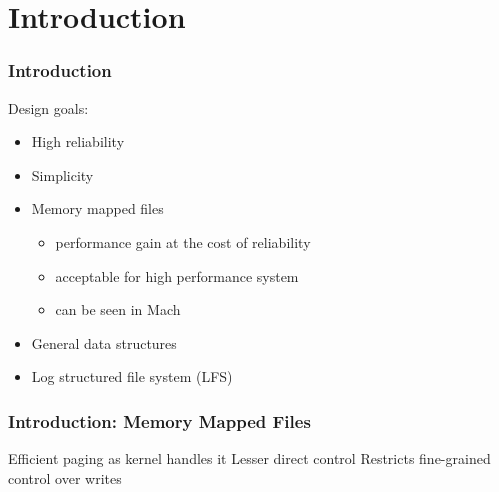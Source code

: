 \section{Introduction}

\begin{frame}
\frametitle{Introduction}
	Design goals:\\[0.5em]
	\begin{itemize}[<+->]
	\setlength\itemsep{1em}
	\item High reliability
	\item Simplicity
	\item Memory mapped files
		\begin{itemize}
			\item performance gain at the cost of reliability
			\item acceptable for high performance system
			\item can be seen in Mach
		\end{itemize}
	\item General data structures
	\item Log structured file system (LFS)
\end{itemize}
\end{frame}

\begin{frame}
	\frametitle{Introduction: Memory Mapped Files}
	\begin{itemize}[<+->]
		\setlength\itemsep{1em}
		\pro Efficient paging as kernel handles it
		\con Lesser direct control
		\con Restricts fine-grained control over writes
	\end{itemize}
\end{frame}
